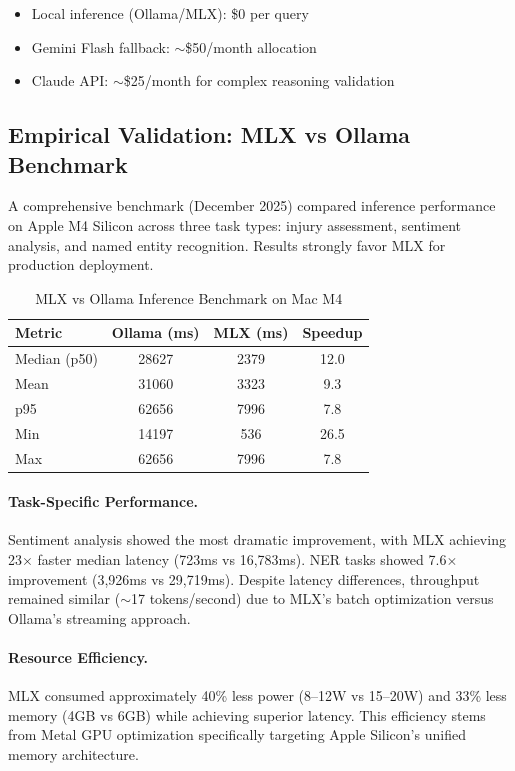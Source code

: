\begin{itemize}[itemsep=2pt,parsep=0pt]
    \item Local inference (Ollama/MLX): \$0 per query
    \item Gemini Flash fallback: $\sim$\$50/month allocation
    \item Claude API: $\sim$\$25/month for complex reasoning validation
\end{itemize}

\subsection{Empirical Validation: MLX vs Ollama Benchmark}
\label{sec:mlx-ollama-benchmark}

A comprehensive benchmark (December 2025) compared inference performance on Apple M4 Silicon across three task types: injury assessment, sentiment analysis, and named entity recognition. Results strongly favor MLX for production deployment.

\begin{table}[htbp]
\centering
\caption{MLX vs Ollama Inference Benchmark on Mac M4}
\label{tab:mlx-benchmark}
\small
\begin{tabular}{@{} l S[table-format=5.0] S[table-format=4.0] S[table-format=2.1] @{}}
\toprule
\textbf{Metric} & {\textbf{Ollama (ms)}} & {\textbf{MLX (ms)}} & {\textbf{Speedup}} \\
\midrule
Median (p50) & 28627 & 2379 & 12.0 \\
Mean & 31060 & 3323 & 9.3 \\
p95 & 62656 & 7996 & 7.8 \\
Min & 14197 & 536 & 26.5 \\
Max & 62656 & 7996 & 7.8 \\
\bottomrule
\end{tabular}
\end{table}

\paragraph{Task-Specific Performance.}
Sentiment analysis showed the most dramatic improvement, with MLX achieving 23$\times$ faster median latency (723ms vs 16,783ms). NER tasks showed 7.6$\times$ improvement (3,926ms vs 29,719ms). Despite latency differences, throughput remained similar ($\sim$17 tokens/second) due to MLX's batch optimization versus Ollama's streaming approach.

\paragraph{Resource Efficiency.}
MLX consumed approximately 40\% less power (8--12W vs 15--20W) and 33\% less memory (4GB vs 6GB) while achieving superior latency. This efficiency stems from Metal GPU optimization specifically targeting Apple Silicon's unified memory architecture.

